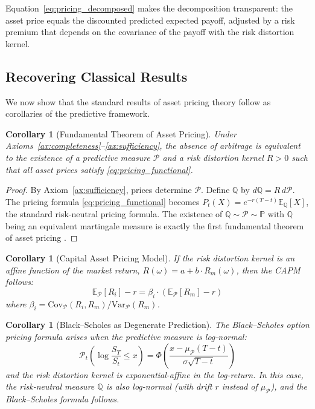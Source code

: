 \documentclass[12pt,a4paper]{article}
\newtheorem{corollary}[theorem]{Corollary}
\theoremstyle{definition}
\newcommand{\E}{\mathbb{E}}
\newcommand{\Prob}{\mathbb{P}}
\newcommand{\Q}{\mathbb{Q}}
\newcommand{\PP}{\mathcal{P}}
\newcommand{\Var}{\mathrm{Var}}
\newcommand{\Cov}{\mathrm{Cov}}
\begin{document}
Equation~\eqref{eq:pricing_decomposed} makes the decomposition transparent: the asset price equals the discounted predicted expected payoff, adjusted by a risk premium that depends on the covariance of the payoff with the risk distortion kernel.

\subsection{Recovering Classical Results}

We now show that the standard results of asset pricing theory follow as corollaries of the predictive framework.

\begin{corollary}[Fundamental Theorem of Asset Pricing]\label{cor:ftap}
Under Axioms~\ref{ax:completeness}--\ref{ax:sufficiency}, the absence of arbitrage is equivalent to the existence of a predictive measure $\PP$ and a risk distortion kernel $R > 0$ such that all asset prices satisfy \eqref{eq:pricing_functional}.
\end{corollary}

\begin{proof}
By Axiom~\ref{ax:sufficiency}, prices determine $\PP$. Define $\Q$ by $d\Q = R \, d\PP$. The pricing formula \eqref{eq:pricing_functional} becomes $P_t(X) = e^{-r(T-t)} \E_\Q[X]$, the standard risk-neutral pricing formula. The existence of $\Q \sim \PP \sim \Prob$ with $\Q$ being an equivalent martingale measure is exactly the first fundamental theorem of asset pricing \citep{harrison1981}.
\end{proof}

\begin{corollary}[Capital Asset Pricing Model]\label{cor:capm}
If the risk distortion kernel is an affine function of the market return, $R(\omega) = a + b \cdot R_m(\omega)$, then the CAPM follows:
\begin{equation}
    \E_{\PP}[R_i] - r = \beta_i \cdot (\E_{\PP}[R_m] - r)
\end{equation}
where $\beta_i = \Cov_{\PP}(R_i, R_m) / \Var_{\PP}(R_m)$.
\end{corollary}

\begin{corollary}[Black--Scholes as Degenerate Prediction]\label{cor:black_scholes}
The Black--Scholes option pricing formula arises when the predictive measure is log-normal:
\begin{equation}
    \PP_t\left(\log \frac{S_T}{S_t} \leq x\right) = \Phi\left(\frac{x - \mu_\PP (T-t)}{\sigma\sqrt{T-t}}\right)
\end{equation}
and the risk distortion kernel is exponential-affine in the log-return. In this case, the risk-neutral measure $\Q$ is also log-normal (with drift $r$ instead of $\mu_\PP$), and the Black--Scholes formula follows.
\end{corollary}
\end{document}
